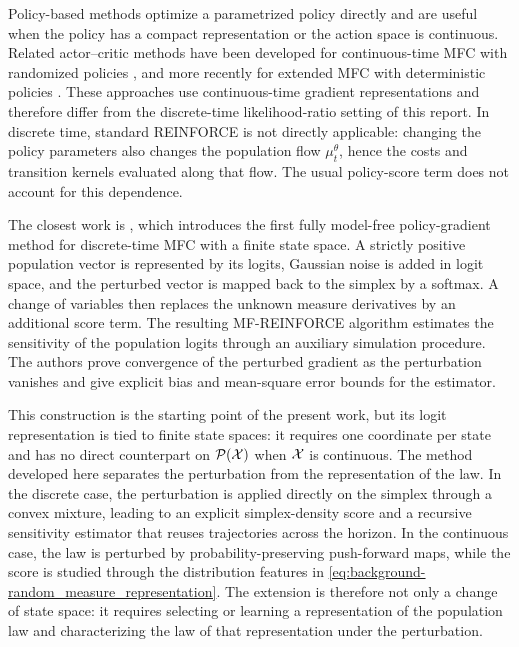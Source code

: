 Policy-based methods optimize a parametrized policy directly and are useful when the policy has a compact representation or the action space is continuous. Related actor--critic methods have been developed for continuous-time MFC with randomized policies \cite{frikha2025actor}, and more recently for extended MFC with deterministic policies \cite{cheng2026actor}. These approaches use continuous-time gradient representations and therefore differ from the discrete-time likelihood-ratio setting of this report. In discrete time, standard REINFORCE is not directly applicable: changing the policy parameters also changes the population flow $\mu_t^\theta$, hence the costs and transition kernels evaluated along that flow. The usual policy-score term does not account for this dependence.

The closest work is \cite{meunier2026model}, which introduces the first fully model-free policy-gradient method for discrete-time MFC with a finite state space. A strictly positive population vector is represented by its logits, Gaussian noise is added in logit space, and the perturbed vector is mapped back to the simplex by a softmax. A change of variables then replaces the unknown measure derivatives by an additional score term. The resulting MF-REINFORCE algorithm estimates the sensitivity of the population logits through an auxiliary simulation procedure. The authors prove convergence of the perturbed gradient as the perturbation vanishes and give explicit bias and mean-square error bounds for the estimator.

This construction is the starting point of the present work, but its logit representation is tied to finite state spaces: it requires one coordinate per state and has no direct counterpart on ${\cal P}({\cal X})$ when ${\cal X}$ is continuous. The method developed here separates the perturbation from the representation of the law. In the discrete case, the perturbation is applied directly on the simplex through a convex mixture, leading to an explicit simplex-density score and a recursive sensitivity estimator that reuses trajectories across the horizon. In the continuous case, the law is perturbed by probability-preserving push-forward maps, while the score is studied through the distribution features in \eqref{eq:background-random_measure_representation}. The extension is therefore not only a change of state space: it requires selecting or learning a representation of the population law and characterizing the law of that representation under the perturbation.
